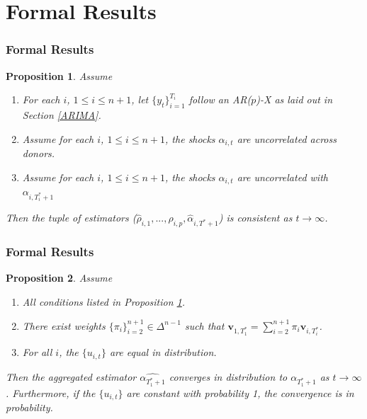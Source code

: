 \documentclass[9pt]{beamer}
\newcommand{\weight}{\pi}
\newtheorem{prop}{Proposition}
\theoremstyle{definition}
\begin{document}
\section{Formal Results}

\begin{frame}\frametitle{Formal Results}

    \begin{prop}\label{ARIMA_param_consistency}
        Assume
          \begin{enumerate}
            \item For each $i$, $1\leq i \leq n + 1$, let $\{y_{t}\}^{T_{i}}_{i=1}$ follow an AR($p$)-X as laid out in Section \ref{ARIMA}.
            \item Assume for each $i$, $1\leq i \leq n + 1$, the shocks $\alpha_{i,t}$ are uncorrelated across donors.
            \item Assume for each $i$, $1\leq i \leq n + 1$, the shocks $\alpha_{i,t}$ are uncorrelated with $\alpha_{i,T_{i}^{*}+1}$ 
           \end{enumerate}
        
        Then the tuple of estimators ($\hat\rho_{i,1},...,\hat\rho_{i, p}, \hat\alpha_{i,T^{*}+1}$) is consistent as $t \rightarrow \infty$.
        \end{prop}

    \end{frame}

        \begin{frame}\frametitle{Formal Results}
        
        \begin{prop}\label{ARIMA_aggregated_alpha}
        Assume
          \begin{enumerate}
            \item All conditions listed in Proposition \ref{ARIMA_param_consistency}.
            \item There exist weights $\{\pi_{i}\}_{i=2}^{n+1} \in \Delta^{n-1}$  such that $\textbf{v}_{1,T_{1}^{*}} = \sum^{n+1}_{i=2}\weight_{i} \textbf{v}_{i,T_{i}^{*}}$.
            \item For all $i$, the $\{u_{i,t}\}$ are equal in distribution.
           \end{enumerate}
        
           Then the aggregated estimator $\hat{\alpha_{T^{*}_{1}+1}}$ converges in distribution to $\alpha_{T^{*}_{1}+1}$ as $t \rightarrow \infty$.  Furthermore, if the $\{u_{i,t}\}$ are constant with probability 1, the convergence is in probability.
          \end{prop}

        \end{frame}
\end{document}
